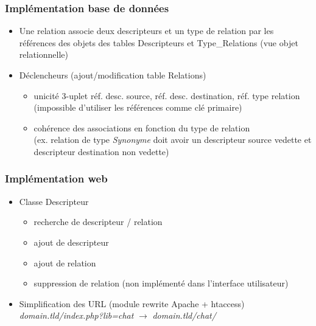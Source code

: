 \documentclass{beamer}
\begin{document}
\begin{frame}
\frametitle{Implémentation base de données}
\begin{itemize}
\item Une relation associe deux descripteurs et un type de relation par les références des objets des tables Descripteurs et Type\_Relations (vue objet relationnelle)
\item Déclencheurs (ajout/modification table Relations)
\begin{itemize}
\item unicité 3-uplet réf. desc. source, réf. desc. destination, réf. type relation (impossible d'utiliser les références comme clé primaire)
\item cohérence des associations en fonction du type de relation\\ (ex. relation de type \emph{Synonyme} doit avoir un descripteur source vedette et descripteur destination non vedette)
\end{itemize}
\end{itemize} 
\end{frame}


\begin{frame}
\frametitle{Implémentation web}
\begin{itemize}
\item Classe Descripteur
\begin{itemize}
\item recherche de descripteur / relation
\item ajout de descripteur
\item ajout de relation
\item suppression de relation (non implémenté dans l'interface utilisateur)
\end{itemize}
\item Simplification des URL (module rewrite Apache + htaccess)\\ \emph{domain.tld/index.php?lib=chat} $\rightarrow$ \emph{domain.tld/chat/}
\end{itemize}
\end{frame}
\end{document}
